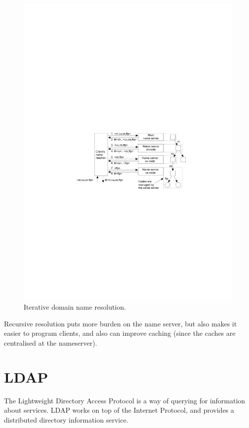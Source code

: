 \begin{figure}[H]
  \centering
  \includegraphics[width=\textwidth]{images/iterative-resolution}
  \caption{Iterative domain name resolution.}
  \label{iterative-resolution}
\end{figure}

Recursive resolution puts more burden on the name server, but also makes it
easier to program clients, and also can improve caching (since the caches are
centralised at the nameserver).

\section{LDAP}

The Lightweight Directory Access Protocol is a way of querying for information
about services. LDAP works on top of the Internet Protocol, and provides a
distributed directory information service.


